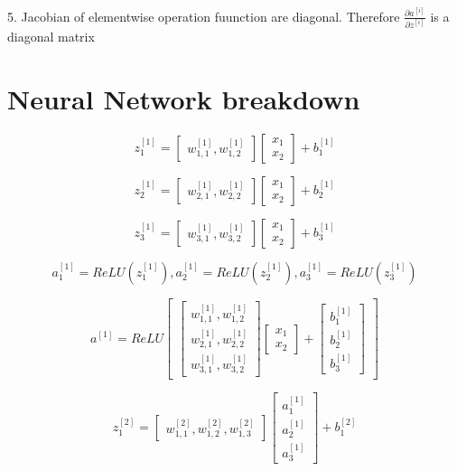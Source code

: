\documentclass{article}
\begin{document}
5. Jacobian of elementwise operation fuunction are diagonal. Therefore  \( \frac{\partial a^{[i]} }{\partial z^{[i]}} \) is a diagonal matrix \newline

\section{Neural Network breakdown}
\[
z_1^{[1]}=
\begin{bmatrix}
w_{1,1}^{[1]},w_{1,2}^{[1]}
\end{bmatrix}
\begin{bmatrix}
x_1 \\ x_2
\end{bmatrix}
+ b_1^{[1]}
\]

\[
z_2^{[1]}=
\begin{bmatrix}
w_{2,1}^{[1]},w_{2,2}^{[1]}
\end{bmatrix}
\begin{bmatrix}
x_1 \\ x_2
\end{bmatrix}
+ b_2^{[1]}
\]

\[
z_3^{[1]}=
\begin{bmatrix}
w_{3,1}^{[1]},w_{3,2}^{[1]}
\end{bmatrix}
\begin{bmatrix}
x_1 \\ x_2
\end{bmatrix}
+ b_3^{[1]}
\]

\[ a_1^{[1]} = ReLU( z_1^{[1]}), a_2^{[1]} = ReLU( z_2^{[1]}), a_3^{[1]} = ReLU( z_3^{[1]}) \]

\[a^{[1]} = ReLU 
\begin{bmatrix}
\begin{bmatrix}
w_{1,1}^{[1]},w_{1,2}^{[1]} \\ 
w_{2,1}^{[1]},w_{2,2}^{[1]} \\ 
w_{3,1}^{[1]},w_{3,2}^{[1]} 
\end{bmatrix}
\begin{bmatrix}
x_1 \\ x_2
\end{bmatrix} +
\begin{bmatrix}
b_1^{[1]} \\ b_2^{[1]} \\ b_3^{[1]}
\end{bmatrix} 
\end{bmatrix}
\]


\[
z_1^{[2]}=
\begin{bmatrix}
w_{1,1}^{[2]},w_{1,2}^{[2]},w_{1,3}^{[2]}
\end{bmatrix}
\begin{bmatrix}
a_1^{[1]} \\ a_2^{[1]} \\ a_3^{[1]}
\end{bmatrix}
+ b_1^{[2]}
\]
\end{document}
